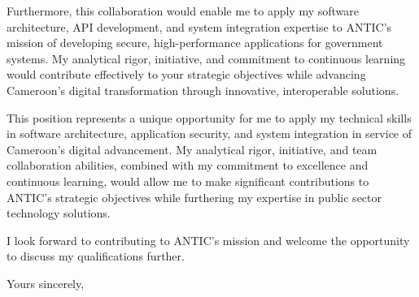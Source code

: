 \documentclass[11pt, a4paper]{../../../awesome-cv}
\begin{document}
\begin{cvletter}
\indent Furthermore, this collaboration would enable me to apply my software architecture, API development, and system integration expertise to ANTIC's mission of developing secure, high-performance applications for government systems. My analytical rigor, initiative, and commitment to continuous learning would contribute effectively to your strategic objectives while advancing Cameroon's digital transformation through innovative, interoperable solutions.

\indent This position represents a unique opportunity for me to apply my technical skills in software architecture, application security, and system integration in service of Cameroon's digital advancement. My analytical rigor, initiative, and team collaboration abilities, combined with my commitment to excellence and continuous learning, would allow me to make significant contributions to ANTIC's strategic objectives while furthering my expertise in public sector technology solutions.

I look forward to contributing to ANTIC's mission and welcome the opportunity to discuss my qualifications further.

Yours sincerely,

\end{cvletter}


\makeletterclosing
\end{document}
